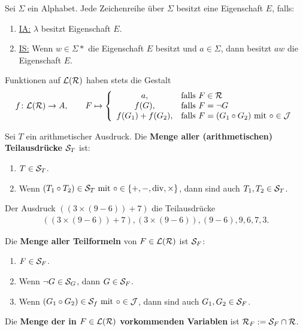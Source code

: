 \begin{lemma}\enter
	Sei $\Sigma$ ein Alphabet.
	Jede Zeichenreihe über $\Sigma$ besitzt eine Eigenschaft $E$, falls:
	\begin{enumerate}
		\item \underline{IA:} $\lambda$ besitzt Eigenschaft $E$.
		\item \underline{IS:} Wenn $w\in\Sigma\ast$ die Eigenschaft $E$ besitzt und $a\in\Sigma$, dann besitzt $aw$ die Eigenschaft $E$.
	\end{enumerate}
\end{lemma}

Funktionen auf $\L(\RR)$ haben stets die Gestalt
\begin{align*}
	f\colon\L(\RR)\to A,\qquad
	F\mapsto\left\lbrace\begin{array}{cl}
		a, &\falls F\in\RR\\
		f(G), &\falls F=\neg G\\
		f(G_1)+f(G_2),&\falls F=(G_1\circ G_2)\mit \circ\in\J
	\end{array}\right.
\end{align*}

\begin{definition}
	Sei $T$ ein arithmetischer Ausdruck.	
	Die \textbf{Menge aller (arithmetischen) Teilausdrücke} $\S_T$ ist:
	\begin{enumerate}
		\item $T\in\S_T$.
		\item Wenn $(T_1\circ T_2)\in\S_T\mit\circ\in\lbrace+,-,\div,\times\rbrace$, dann sind auch $T_1,T_2\in\S_T$.
	\end{enumerate}
\end{definition}

\begin{beispiel}
	Der Ausdruck $((3\times(9-6))+7)$ die Teilausdrücke
	\begin{align*}
		((3\times(9-6))+7),
		(3\times(9-6)),
		(9-6),
		9,6,7,3.
	\end{align*}
\end{beispiel}

\begin{definition}
	Die \textbf{Menge aller Teilformeln} von $F\in\L(\RR)$ ist $\S_F$:
	\begin{enumerate}
		\item $F\in\S_F$.
		\item Wenn $\neg G\in\S_G$, dann $G\in\S_F$.
		\item Wenn $(G_1\circ G_2)\in\S_f\mit\circ\in\J$, dann sind auch $G_1,G_2\in\S_F$.
	\end{enumerate}
	Die \textbf{Menge der in $F\in\L(\RR)$ vorkommenden Variablen} ist $\RR_F:=\S_F\cap\RR$.
\end{definition}

